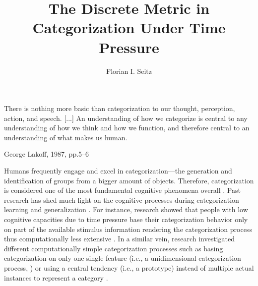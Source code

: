 \documentclass[a4paper,man,natbib]{apa6}
\title{The Discrete Metric in Categorization Under Time Pressure}
\author{Florian I. Seitz}
\affiliation{University of Basel}
\begin{document}

\maketitle

\epigraph{There is nothing more basic than categorization to our thought, perception, action, and speech. [...] An understanding of how we categorize is central to any understanding of how we think and how we function, and therefore central to an understanding of what makes us human.}{George Lakoff, 1987, pp.5--6}

Humans frequently engage and excel in categorization---the generation and identification of groups from a bigger amount of objects. Therefore, categorization is considered one of the most fundamental cognitive phenomena overall \citep{ashby2001categorization, bruner1956study, cohen2005bridging, lakoff1987women, goldstone2003concepts}. Past research has shed much light on the cognitive processes during categorization learning and generalization \citep[for an overview over the diverse cognitive models of categorization, see][]{kruschke2008models,wills2013models}. For instance, research 
showed that people with low cognitive capacities due to time pressure base their categorization behavior only on part of the available stimulus information rendering the categorization process thus computationally less extensive \citep{lamberts1995categorization, lamberts1998time, lamberts1999building, lamberts1999categorization, lamberts1997fast}. In a similar vein, research investigated different computationally simple categorization processes such as basing categorization on only one single feature (i.e., a unidimensional categorization process, \citealp{johansen2002there}) or using a central tendency (i.e., a prototype) instead of multiple actual instances to represent a category \citep{smith1998prototypes}. 
\end{document}
